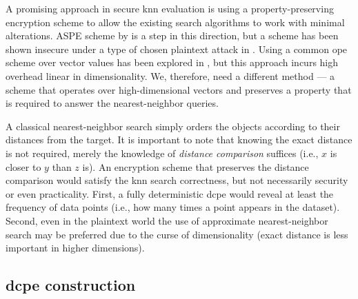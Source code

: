 		A promising approach in secure \acrshort{knn} evaluation is using a property-preserving encryption scheme to allow the existing search algorithms to work with minimal alterations.
		ASPE scheme by \textcite{knn-aspe} is a step in this direction, but a scheme has been shown insecure under a type of chosen plaintext attack in \cite{secure-nn-revisited-break-aspe}.
		Using a common \acrshort{ope} scheme over vector values has been explored in \cite{quick-n}, but this approach incurs high overhead linear in dimensionality.
		We, therefore, need a different method --- a scheme that operates over high-dimensional vectors and preserves a property that is required to answer the nearest-neighbor queries.

		A classical nearest-neighbor search \cite{knn-wong,knn-cunningham} simply orders the objects according to their distances from the target.
		It is important to note that knowing the exact distance is not required, merely the knowledge of \emph{distance comparison} suffices (i.e., $x$ is closer to $y$ than $z$ is).
		An encryption scheme that preserves the distance comparison would satisfy the \acrshort{knn} search correctness, but not necessarily security or even practicality.
		First, a fully deterministic \acrfull{dcpe} would reveal at least the frequency of data points (i.e., how many times a point appears in the dataset).
		Second, even in the plaintext world the use of approximate nearest-neighbor search \cite{scalable-nn,approximate-nn-fixed-d} may be preferred due to the curse of dimensionality \cite{nn-meaningful,nn-curse-of-d} (exact distance is less important in higher dimensions).

		\subsection{\texorpdfstring{\acrshort{dcpe}}{DCPE} construction}

